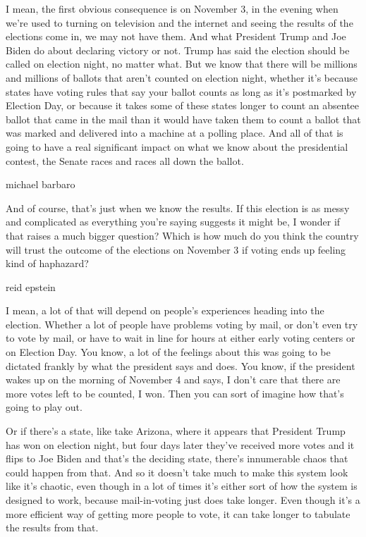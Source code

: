 I mean, the first obvious consequence is on November 3, in the evening
when we're used to turning on television and the internet and seeing the
results of the elections come in, we may not have them. And what
President Trump and Joe Biden do about declaring victory or not. Trump
has said the election should be called on election night, no matter
what. But we know that there will be millions and millions of ballots
that aren't counted on election night, whether it's because states have
voting rules that say your ballot counts as long as it's postmarked by
Election Day, or because it takes some of these states longer to count
an absentee ballot that came in the mail than it would have taken them
to count a ballot that was marked and delivered into a machine at a
polling place. And all of that is going to have a real significant
impact on what we know about the presidential contest, the Senate races
and races all down the ballot.

michael barbaro

And of course, that's just when we know the results. If this election is
as messy and complicated as everything you're saying suggests it might
be, I wonder if that raises a much bigger question? Which is how much do
you think the country will trust the outcome of the elections on
November 3 if voting ends up feeling kind of haphazard?

reid epstein

I mean, a lot of that will depend on people's experiences heading into
the election. Whether a lot of people have problems voting by mail, or
don't even try to vote by mail, or have to wait in line for hours at
either early voting centers or on Election Day. You know, a lot of the
feelings about this was going to be dictated frankly by what the
president says and does. You know, if the president wakes up on the
morning of November 4 and says, I don't care that there are more votes
left to be counted, I won. Then you can sort of imagine how that's going
to play out.

Or if there's a state, like take Arizona, where it appears that
President Trump has won on election night, but four days later they've
received more votes and it flips to Joe Biden and that's the deciding
state, there's innumerable chaos that could happen from that. And so it
doesn't take much to make this system look like it's chaotic, even
though in a lot of times it's either sort of how the system is designed
to work, because mail-in-voting just does take longer. Even though it's
a more efficient way of getting more people to vote, it can take longer
to tabulate the results from that.

